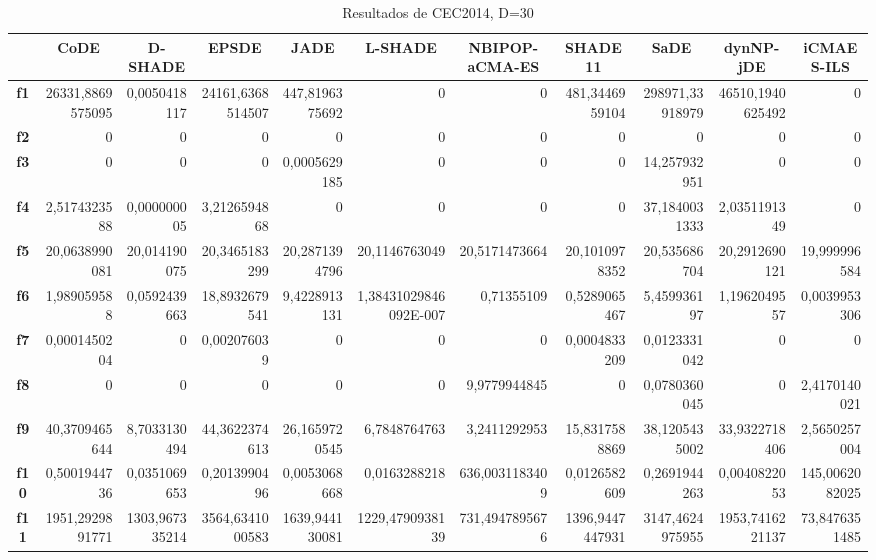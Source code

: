 \documentclass[a4paper,11pt]{article}
\begin{document}
  
  \begin{table}[H]
  \caption{Resultados de CEC2014, D=30}
  \begin{adjustbox}{width=1.15\textwidth}
  \centering
  \begin{tabular}{|c|r|r|r|r|r|r|r|r|r|r|}
  \hline
  \multicolumn{1}{|l|}{} & \multicolumn{1}{c|}{\textbf{CoDE}} & \multicolumn{1}{c|}{\textbf{D-SHADE}} & \multicolumn{1}{c|}{\textbf{EPSDE}} & \multicolumn{1}{c|}{\textbf{JADE}} & \multicolumn{1}{c|}{\textbf{L-SHADE}} & \multicolumn{1}{c|}{\textbf{NBIPOP-aCMA-ES}} & \multicolumn{1}{c|}{\textbf{SHADE11}} & \multicolumn{1}{c|}{\textbf{SaDE}} & \multicolumn{1}{c|}{\textbf{dynNP-jDE}} & \multicolumn{1}{c|}{\textbf{iCMAES-ILS}} \\ \hline
  \textbf{f1} & 26331,8869575095 & 0,0050418117 & 24161,6368514507 & 447,8196375692 & 0 & 0 & 481,3446959104 & 298971,33918979 & 46510,1940625492 & 0 \\ \hline
  \textbf{f2} & 0 & 0 & 0 & 0 & 0 & 0 & 0 & 0 & 0 & 0 \\ \hline
  \textbf{f3} & 0 & 0 & 0 & 0,0005629185 & 0 & 0 & 0 & 14,257932951 & 0 & 0 \\ \hline
  \textbf{f4} & 2,5174323588 & 0,000000005 & 3,2126594868 & 0 & 0 & 0 & 0 & 37,1840031333 & 2,0351191349 & 0 \\ \hline
  \textbf{f5} & 20,0638990081 & 20,014190075 & 20,3465183299 & 20,2871394796 & 20,1146763049 & 20,5171473664 & 20,1010978352 & 20,535686704 & 20,2912690121 & 19,999996584 \\ \hline
  \textbf{f6} & 1,989059588 & 0,0592439663 & 18,8932679541 & 9,4228913131 & 1,38431029846092E-007 & 0,71355109 & 0,5289065467 & 5,459936197 & 1,1962049557 & 0,0039953306 \\ \hline
  \textbf{f7} & 0,0001450204 & 0 & 0,002076039 & 0 & 0 & 0 & 0,0004833209 & 0,0123331042 & 0 & 0 \\ \hline
  \textbf{f8} & 0 & 0 & 0 & 0 & 0 & 9,9779944845 & 0 & 0,0780360045 & 0 & 2,4170140021 \\ \hline
  \textbf{f9} & 40,3709465644 & 8,7033130494 & 44,3622374613 & 26,1659720545 & 6,7848764763 & 3,2411292953 & 15,8317588869 & 38,1205435002 & 33,9322718406 & 2,5650257004 \\ \hline
  \textbf{f10} & 0,5001944736 & 0,0351069653 & 0,2013990496 & 0,0053068668 & 0,0163288218 & 636,0031183409 & 0,0126582609 & 0,2691944263 & 0,0040822053 & 145,0062082025 \\ \hline
  \textbf{f11} & 1951,2929891771 & 1303,967335214 & 3564,6341000583 & 1639,944130081 & 1229,4790938139 & 731,4947895676 & 1396,9447447931 & 3147,4624975955 & 1953,7416221137 & 73,8476351485 \\ \hline

\end{tabular}
\end{adjustbox}
\end{table}
\end{document}
